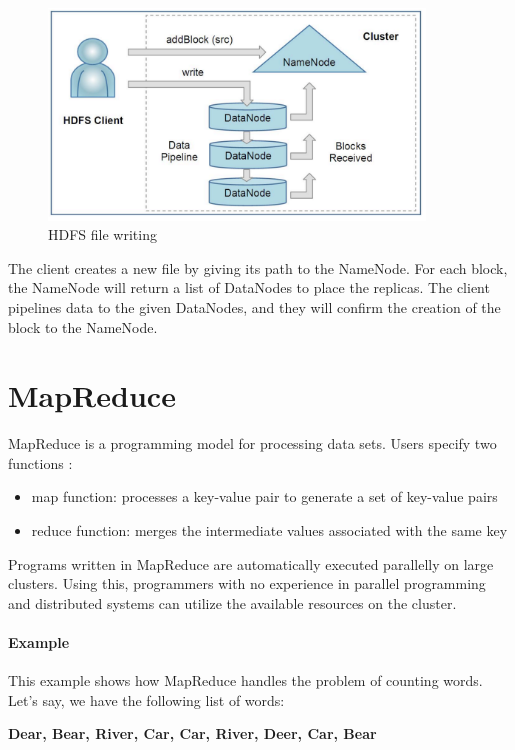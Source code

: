 \begin{figure}[H]
	\includegraphics[width=100mm, keepaspectratio]{figures/hdfs_client.png}
	\centering
	\caption{HDFS file writing}
\end{figure}
The client creates a new file by giving its path to the NameNode. For each block, the NameNode will return a list of DataNodes to place the replicas. The client pipelines data to the given DataNodes, and they will confirm the creation of the block to the NameNode.

\section{MapReduce}
MapReduce is a programming model for processing data sets. Users specify two functions \cite{Dean:2004:MSD:1251254.1251264}:
\begin{itemize}
	\item map function: processes a key-value pair to generate a set of key-value pairs
	\item reduce function: merges the intermediate values associated with the same key
\end{itemize}

Programs written in MapReduce are automatically executed parallelly on large clusters. Using this, programmers with no experience in parallel programming and distributed systems can utilize the available resources on the cluster.
\paragraph{Example \cite{MapReduce-example}}
This example shows how MapReduce handles the problem of counting words. Let's say, we have the following list of words: 
\begin{center}
	\textbf{Dear, Bear, River, Car, Car, River, Deer, Car, Bear}
\end{center}

